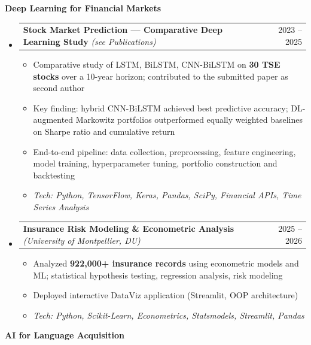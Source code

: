 \documentclass[11pt,a4paper]{article}
\makeatletter
\newcommand{\subspace}{\vspace{0.5em}}
\newcommand{\cvsubsection}[1]{
    \subspace
    \noindent\textcolor{primary}{\large \textbf{#1}}
    \par\vspace{0.3em}
}
\newcommand{\headerrow}[2]{
    \begin{tabular*}{\linewidth}{l@{\extracolsep{\fill}}r}
    #1 & \textcolor{primary}{#2} \\
    \end{tabular*}
}
\makeatother
\begin{document}
\cvsubsection{Deep Learning for Financial Markets}

\begin{itemize}[leftmargin=1em, label={}]

    \item
    \headerrow{\textbf{Stock Market Prediction — Comparative Deep Learning Study} \emph{(see Publications)}}{2023 -- 2025}
    \begin{itemize}[leftmargin=1.5em, label=$\bullet$, nosep]
        \item Comparative study of LSTM, BiLSTM, CNN-BiLSTM on \textbf{30 TSE stocks} over a 10-year horizon; contributed to the submitted paper as second author
        \item Key finding: hybrid CNN-BiLSTM achieved best predictive accuracy; DL-augmented Markowitz portfolios outperformed equally weighted baselines on Sharpe ratio and cumulative return
        \item End-to-end pipeline: data collection, preprocessing, feature engineering, model training, hyperparameter tuning, portfolio construction and backtesting
        \item \emph{Tech: Python, TensorFlow, Keras, Pandas, SciPy, Financial APIs, Time Series Analysis}
    \end{itemize}

    \subspace
    \item
    \headerrow{\textbf{Insurance Risk Modeling \& Econometric Analysis} \emph{(University of Montpellier, DU)}}{2025 -- 2026}
    \begin{itemize}[leftmargin=1.5em, label=$\bullet$, nosep]
        \item Analyzed \textbf{922,000+ insurance records} using econometric models and ML; statistical hypothesis testing, regression analysis, risk modeling
        \item Deployed interactive DataViz application (Streamlit, OOP architecture)
        \item \emph{Tech: Python, Scikit-Learn, Econometrics, Statsmodels, Streamlit, Pandas}
    \end{itemize}

\end{itemize}

\cvsubsection{AI for Language Acquisition}
\end{document}

